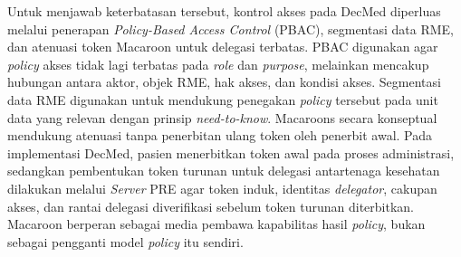 Untuk menjawab keterbatasan tersebut, kontrol akses pada DecMed diperluas melalui penerapan \textit{Policy-Based Access Control} (PBAC), segmentasi data RME, dan atenuasi token Macaroon untuk delegasi terbatas. PBAC digunakan agar \textit{policy} akses tidak lagi terbatas pada \textit{role} dan \textit{purpose}, melainkan mencakup hubungan antara aktor, objek RME, hak akses, dan kondisi akses. Segmentasi data RME digunakan untuk mendukung penegakan \textit{policy} tersebut pada unit data yang relevan dengan prinsip \textit{need-to-know}. Macaroons secara konseptual mendukung atenuasi tanpa penerbitan ulang token oleh penerbit awal. Pada implementasi DecMed, pasien menerbitkan token awal pada proses administrasi, sedangkan pembentukan token turunan untuk delegasi antartenaga kesehatan dilakukan melalui \textit{Server} PRE agar token induk, identitas \textit{delegator}, cakupan akses, dan rantai delegasi diverifikasi sebelum token turunan diterbitkan. Macaroon berperan sebagai media pembawa kapabilitas hasil \textit{policy}, bukan sebagai pengganti model \textit{policy} itu sendiri.